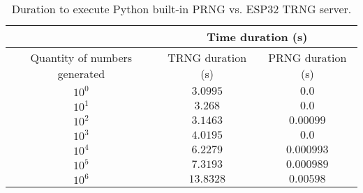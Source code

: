 \begin{table}[]
\caption{Duration to execute Python built-in PRNG vs. ESP32 TRNG server.}
\label{table:1}
\begin{tabular}{|c|c|c|}
\hline
                              & \multicolumn{2}{c|}{Time duration (s)} \\ \hline
Quantity of numbers generated & TRNG duration (s)  & PRNG duration (s) \\ \hline
$10^0$                        & $3.0995$           & $0.0$             \\ \hline
$10^1$                        & $3.268$            & $0.0$             \\ \hline
$10^2$                        & $3.1463$           & $0.00099$         \\ \hline
$10^3$                        & $4.0195$           & $0.0$             \\ \hline
$10^4$                        & $6.2279$           & $0.000993$        \\ \hline
$10^5$                        & $7.3193$           & $0.000989$        \\ \hline
$10^6$                        & $13.8328$          & $0.00598$         \\ \hline
\end{tabular}
\end{table}